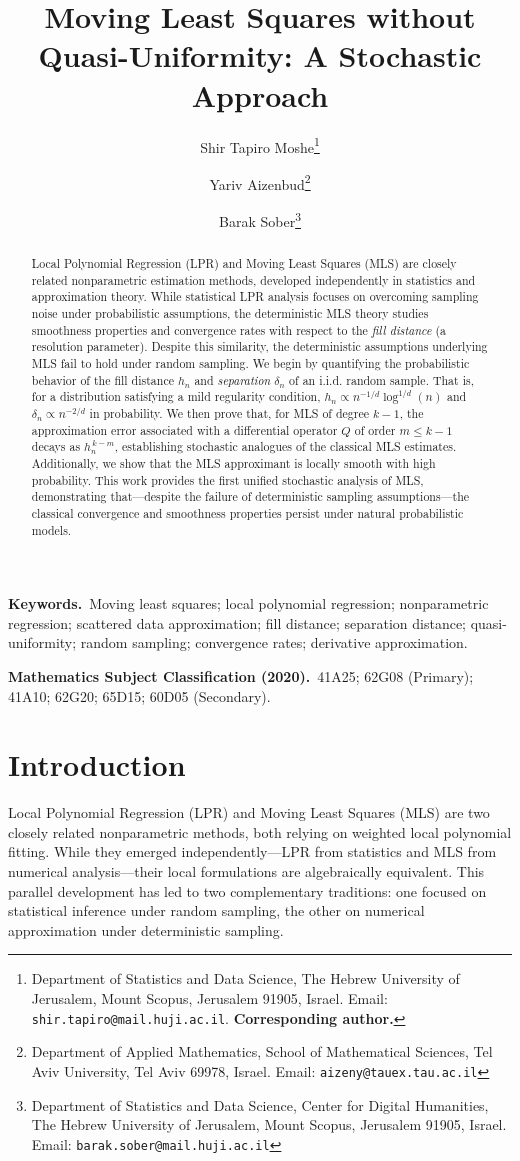\documentclass{article}
\title{Moving Least Squares without Quasi-Uniformity: A Stochastic Approach
}
\author{
Shir Tapiro Moshe\thanks{Department of Statistics and Data Science, The Hebrew University of Jerusalem, Mount Scopus, Jerusalem 91905, Israel. Email: \texttt{shir.tapiro@mail.huji.ac.il}. \textbf{Corresponding author.}}
\and
Yariv Aizenbud\thanks{Department of Applied Mathematics, School of Mathematical Sciences, Tel Aviv University, Tel Aviv 69978, Israel. Email: \texttt{aizeny@tauex.tau.ac.il}}
\and
Barak Sober\thanks{Department of Statistics and Data Science, Center for Digital Humanities, The Hebrew University of Jerusalem, Mount Scopus, Jerusalem 91905, Israel. Email: \texttt{barak.sober@mail.huji.ac.il}}
}
\begin{document}
\date{}
\maketitle

\begin{abstract}
Local Polynomial Regression (LPR) and Moving Least Squares (MLS) are closely related nonparametric estimation methods, developed independently in statistics and approximation theory. While statistical LPR analysis focuses on overcoming sampling noise under probabilistic assumptions, the deterministic MLS theory studies smoothness properties and convergence rates with respect to the \textit{fill distance} (a resolution parameter). Despite this similarity, the deterministic assumptions underlying MLS fail to hold under random sampling.
We begin by quantifying the probabilistic behavior of the fill distance $h_n$ and \textit{separation} $\delta_n$ of an i.i.d. random sample. 
That is, for a distribution satisfying a mild regularity condition, $h_n\propto n^{-1/d}\log^{1/d} (n)$ and $\delta_n \propto n^{-2/d}$ in probability.
We then prove that, for MLS of degree $k\!-\!1$, the approximation error associated with a differential operator $Q$ of order $m\le k-1$ decays as $h_n^{\,k-m}$, establishing stochastic analogues of the classical MLS estimates.
Additionally, we show that the MLS approximant is locally smooth with high probability.
This work provides the first unified stochastic analysis of MLS, demonstrating that---despite the failure of deterministic sampling assumptions---the classical convergence and smoothness properties persist under natural probabilistic models.
\end{abstract}

\medskip
\noindent\textbf{Keywords.}\ Moving least squares; local polynomial regression;
nonparametric regression; scattered data approximation; fill distance;
separation distance; quasi-uniformity; random sampling; convergence rates;
derivative approximation.

\medskip
\noindent\textbf{Mathematics Subject Classification (2020).}\ 41A25; 62G08
\textup{(Primary)}; 41A10; 62G20; 65D15; 60D05 \textup{(Secondary)}.


\section{Introduction}

Local Polynomial Regression (LPR) and Moving Least Squares (MLS) are two closely related nonparametric methods, both relying on weighted local polynomial fitting. While they emerged independently—LPR from statistics and MLS from numerical analysis—their local formulations are algebraically equivalent. This parallel development has led to two complementary traditions: one focused on statistical inference under random sampling, the other on numerical approximation under deterministic sampling.
\end{document}
